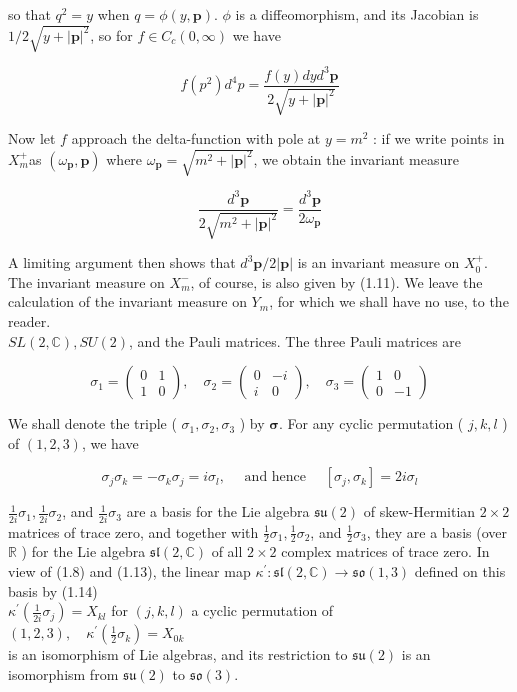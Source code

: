 \documentclass[10pt, letterpaper]{article}
\begin{document}
so that $q^{2}=y$ when $q=\phi(y, \mathbf{p})$. $\phi$ is a diffeomorphism, and its Jacobian is $1 / 2 \sqrt{y+|\mathbf{p}|^{2}}$, so for $f \in C_{c}(0, \infty)$ we have

$$
f\left(p^{2}\right) d^{4} p=\frac{f(y) d y d^{3} \mathbf{p}}{2 \sqrt{y+|\mathbf{p}|^{2}}}
$$

Now let $f$ approach the delta-function with pole at $y=m^{2}$ : if we write points in $X_{m}^{+}$as $\left(\omega_{\mathbf{p}}, \mathbf{p}\right)$ where $\omega_{\mathbf{p}}=\sqrt{m^{2}+|\mathbf{p}|^{2}}$, we obtain the invariant measure

$$
\frac{d^{3} \mathbf{p}}{2 \sqrt{m^{2}+|\mathbf{p}|^{2}}}=\frac{d^{3} \mathbf{p}}{2 \omega_{\mathbf{p}}}
$$

A limiting argument then shows that $d^{3} \mathbf{p} / 2|\mathbf{p}|$ is an invariant measure on $X_{0}^{+}$. The invariant measure on $X_{m}^{-}$, of course, is also given by (1.11). We leave the calculation of the invariant measure on $Y_{m}$, for which we shall have no use, to the reader.\\
$S L(2, \mathbb{C}), S U(2)$, and the Pauli matrices. The three Pauli matrices are

$$
\sigma_{1}=\left(\begin{array}{cc}
0 & 1 \\
1 & 0
\end{array}\right), \quad \sigma_{2}=\left(\begin{array}{cc}
0 & -i \\
i & 0
\end{array}\right), \quad \sigma_{3}=\left(\begin{array}{cc}
1 & 0 \\
0 & -1
\end{array}\right)
$$

We shall denote the triple ( $\sigma_{1}, \sigma_{2}, \sigma_{3}$ ) by $\boldsymbol{\sigma}$. For any cyclic permutation ( $j, k, l$ ) of $(1,2,3)$, we have

$$
\sigma_{j} \sigma_{k}=-\sigma_{k} \sigma_{j}=i \sigma_{l}, \quad \text { and hence } \quad\left[\sigma_{j}, \sigma_{k}\right]=2 i \sigma_{l}
$$

$\frac{1}{2 i} \sigma_{1}, \frac{1}{2 i} \sigma_{2}$, and $\frac{1}{2 i} \sigma_{3}$ are a basis for the Lie algebra $\mathfrak{s u}(2)$ of skew-Hermitian $2 \times 2$ matrices of trace zero, and together with $\frac{1}{2} \sigma_{1}, \frac{1}{2} \sigma_{2}$, and $\frac{1}{2} \sigma_{3}$, they are a basis (over $\mathbb{R}$ ) for the Lie algebra $\mathfrak{s l}(2, \mathbb{C})$ of all $2 \times 2$ complex matrices of trace zero. In view of (1.8) and (1.13), the linear map $\kappa^{\prime}: \mathfrak{s} \mathfrak{l}(2, \mathbb{C}) \rightarrow \mathfrak{s} \mathfrak{o}(1,3)$ defined on this basis by (1.14)\\
$\kappa^{\prime}\left(\frac{1}{2 i} \sigma_{j}\right)=X_{k l}$ for $(j, k, l)$ a cyclic permutation of $(1,2,3), \quad \kappa^{\prime}\left(\frac{1}{2} \sigma_{k}\right)=X_{0 k}$\\
is an isomorphism of Lie algebras, and its restriction to $\mathfrak{s u}(2)$ is an isomorphism from $\mathfrak{s u}(2)$ to $\mathfrak{s} \mathfrak{o}(3)$.
\end{document}
